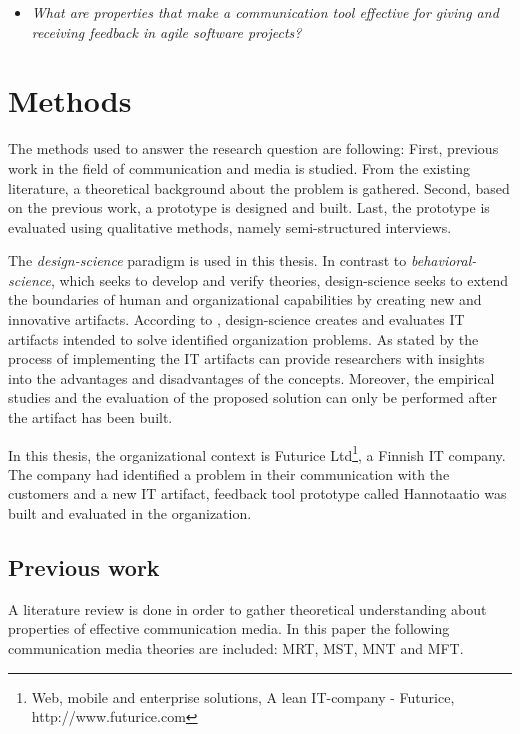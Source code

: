 \documentclass[english,12pt,a4paper,pdftex]{article}
\begin{document}
\begin{itemize}
\item \textit{What are properties that make a communication tool effective for giving and receiving feedback in agile software projects?}
\end{itemize}

\clearpage

\section{Methods}
\acresetall

The methods used to answer the research question are following: First, previous work in the field of communication and media is studied. From the existing literature, a theoretical background about the problem is gathered. Second, based on the previous work, a prototype is designed and built. Last, the prototype is evaluated using qualitative methods, namely semi-structured interviews.

The \emph{design-science} paradigm is used in this thesis. In contrast to \emph{behavioral-science}, which seeks to develop and verify theories, design-science seeks to extend the boundaries of human and organizational capabilities by creating new and innovative artifacts. According to \citet{hevner2004}, design-science creates and evaluates IT artifacts intended to solve identified organization problems. As stated by \citep{nunamaker1990} the process of implementing the IT artifacts can provide researchers with insights into the advantages and disadvantages of the concepts. Moreover, the empirical studies and the evaluation of the proposed solution can only be performed after the artifact has been built.

In this thesis, the organizational context is Futurice Ltd\footnote{Web, mobile and enterprise solutions, A lean IT-company - Futurice, http://www.futurice.com}, a Finnish IT company. The company had identified a problem in their communication with the customers and a new IT artifact, feedback tool prototype called Hannotaatio was built and evaluated in the organization.

\subsection{Previous work}

A literature review is done in order to gather theoretical understanding about properties of effective communication media. In this paper the following communication media theories are included: \ac{MRT}, \ac{MST}, \ac{MNT} and \ac{MFT}. 
\end{document}
